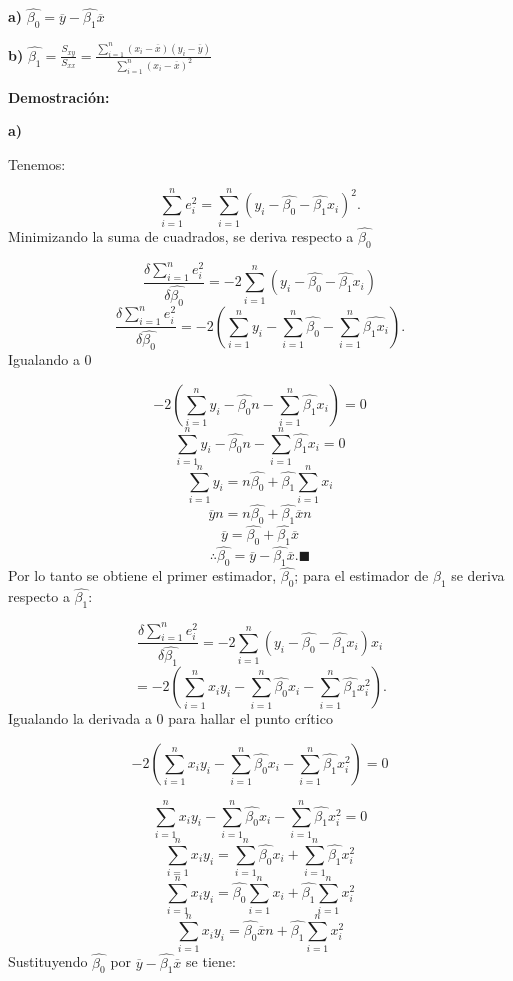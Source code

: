 \documentclass[
  a4paper,
  oneside,
  openany]{book}
\begin{document}
\textbf{a)} \(\hat{\beta_{0}}=\overline{y}-\hat{\beta_{1}}\overline{x}\)

\textbf{b)} \(\hat{\beta_{1}}=\frac{S_{xy}}{S_{xx}}=\frac{\sum_{i=1}^{n}(x_{i}-\overline{x})(y_{i}-\overline{y})}{\sum_{i=1}^{n}(x_{i}-\overline{x})^2}\)

\textbf{Demostración:}

\textbf{a)}

Tenemos:

\[\sum_{i=1}^{n}e_{i}^2=\sum_{i=1}^{n}(y_{i}-\hat{\beta_{0}}-\hat{\beta_{1}}x_{i})^2.\]
Minimizando la suma de cuadrados, se deriva respecto a \(\hat{\beta_{0}}\)

\[\frac{\delta\sum_{i=1}^{n}e_{i}^2}{\delta\hat{\beta_{0}}}=-2\sum_{i=1}^{n}(y_{i}-\hat{\beta_{0}}-\hat{\beta_{1}}x_{i})\]
\[\frac{\delta\sum_{i=1}^{n}e_{i}^2}{\delta\hat{\beta_{0}}}=-2\left(\sum_{i=1}^{n}y_{i}-\sum_{i=1}^{n}\hat{\beta_{0}}-\sum_{i=1}^{n}\hat{\beta_{1}x_{i}}\right).\]
Igualando a 0

\[-2\left(\sum_{i=1}^{n}y_{i}-\hat{\beta_{0}}n-\sum_{i=1}^{n}\hat{\beta_{1}}x_{i}\right)=0\]
\[\sum_{i=1}^{n}y_{i}-\hat{\beta_{0}}n-\sum_{i=1}^{n}\hat{\beta_{1}}x_{i}=0\]
\[\sum_{i=1}^{n}y_{i}=n\hat{\beta_{0}}+\hat{\beta_{1}}\sum_{i=1}^{n}x_{i}\]
\[\overline{y}n=n\hat{\beta_{0}}+\hat{\beta_{1}}\overline{x}n\]
\[\overline{y}=\hat{\beta_{0}}+\hat{\beta_{1}}\overline{x}\]
\[\therefore\hat{\beta_{0}}=\overline{y}-\hat{\beta_{1}}\overline{x}.\blacksquare\]
Por lo tanto se obtiene el primer estimador, \(\hat{\beta_{0}}\); para el estimador de \(\beta_{1}\) se deriva respecto a \(\hat{\beta_{1}}\):

\[\frac{\delta\sum_{i=1}^{n}e_{i}^2}{\delta\hat{\beta_{1}}}=-2\sum_{i=1}^{n}(y_{i}-\hat{\beta_{0}}-\hat{\beta_{1}}x_{i})x_{i}\]
\[=-2\left(\sum_{i=1}^{n}x_{i}y_{i}-\sum_{i=1}^{n}\hat{\beta_{0}}x_{i}-\sum_{i=1}^{n}\hat{\beta_{1}}x_{i}^2\right).\]
Igualando la derivada a 0 para hallar el punto crítico

\[-2\left(\sum_{i=1}^{n}x_{i}y_{i}-\sum_{i=1}^{n}\hat{\beta_{0}}x_{i}-\sum_{i=1}^{n}\hat{\beta_{1}}x_{i}^2\right)=0\]

\[\sum_{i=1}^{n}x_{i}y_{i}-\sum_{i=1}^{n}\hat{\beta_{0}}x_{i}-\sum_{i=1}^{n}\hat{\beta_{1}}x_{i}^2=0\]
\[\sum_{i=1}^{n}x_{i}y_{i}=\sum_{i=1}^{n}\hat{\beta_{0}}x_{i}+\sum_{i=1}^{n}\hat{\beta_{1}}x_{i}^2\]
\[\sum_{i=1}^{n}x_{i}y_{i}=\hat{\beta_{0}}\sum_{i=1}^{n}x_{i}+\hat{\beta_{1}}\sum_{i=1}^{n}x_{i}^2\]
\[\sum_{i=1}^{n}x_{i}y_{i}=\hat{\beta_{0}}\overline{x}n+\hat{\beta_{1}}\sum_{i=1}^{n}x_{i}^2\]
Sustituyendo \(\hat{\beta_{0}}\) por \(\overline{y}-\hat{\beta_{1}}\overline{x}\) se tiene:
\end{document}
